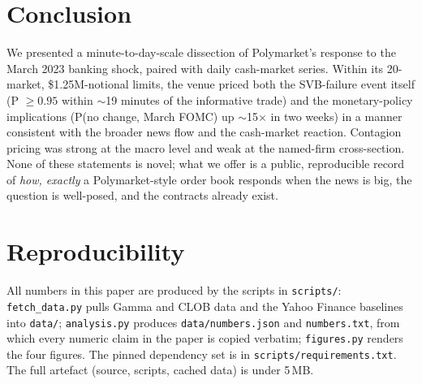 \documentclass{article}
\begin{document}
\section{Conclusion}
\label{sec:conclusion}

We presented a minute-to-day-scale dissection of Polymarket's response to
the March 2023 banking shock, paired with daily cash-market series.
Within its 20-market, \$1.25M-notional limits, the venue priced both the
SVB-failure event itself (P $\geq 0.95$ within $\sim$19 minutes of the
informative trade) and the monetary-policy implications (P(no change,
March FOMC) up $\sim$15$\times$ in two weeks) in a manner consistent
with the broader news flow and the cash-market reaction.  Contagion
pricing was strong at the macro level and weak at the named-firm
cross-section.  None of these statements is novel; what we offer is a
public, reproducible record of \emph{how, exactly} a Polymarket-style
order book responds when the news is big, the question is well-posed,
and the contracts already exist.

\section*{Reproducibility}
All numbers in this paper are produced by the scripts in
\texttt{scripts/}: \texttt{fetch\_data.py} pulls Gamma and CLOB data and
the Yahoo Finance baselines into \texttt{data/};
\texttt{analysis.py} produces \texttt{data/numbers.json} and
\texttt{numbers.txt}, from which every numeric claim in the paper is
copied verbatim; \texttt{figures.py} renders the four figures.  The
pinned dependency set is in \texttt{scripts/requirements.txt}.  The full
artefact (source, scripts, cached data) is under 5\,MB.



\end{document}
